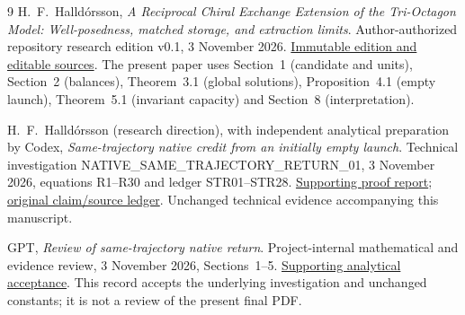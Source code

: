 \begin{thebibliography}{9}
H.~F.~Halld\'orsson,
\emph{A Reciprocal Chiral Exchange Extension of the Tri-Octagon Model:
Well-posedness, matched storage, and extraction limits}.
Author-authorized repository research edition v0.1, 3 November 2026.
\href{https://github.com/pzychozen/trioctagon-physics/tree/273b1a6faaab19ea58748d00576439166eeef9ab/papers/RECIPROCAL_CHIRAL_EXCHANGE/publication/v0.1}{Immutable edition and editable sources}.
The present paper uses Section~1 (candidate and units), Section~2 (balances),
Theorem~3.1 (global solutions), Proposition~4.1 (empty launch),
Theorem~5.1 (invariant capacity) and Section~8 (interpretation).

H.~F.~Halld\'orsson (research direction), with independent analytical preparation by Codex,
\emph{Same-trajectory native credit from an initially empty launch}.
Technical investigation NATIVE\_SAME\_TRAJECTORY\_RETURN\_01,
3 November 2026, equations R1--R30 and ledger STR01--STR28.
\href{evidence/investigation/NATIVE_SAME_TRAJECTORY_RETURN_01_PROOF.md}{Supporting proof report};
\href{evidence/investigation/NATIVE_SAME_TRAJECTORY_RETURN_01_CLAIM_SOURCE_LEDGER.md}{original claim/source ledger}.
Unchanged technical evidence accompanying this manuscript.

GPT,
\emph{Review of same-trajectory native return}.
Project-internal mathematical and evidence review,
3 November 2026, Sections~1--5.
\href{evidence/current_gpt_review.md}{Supporting analytical acceptance}.
This record accepts the underlying investigation and unchanged constants;
it is not a review of the present final PDF.
\end{thebibliography}
